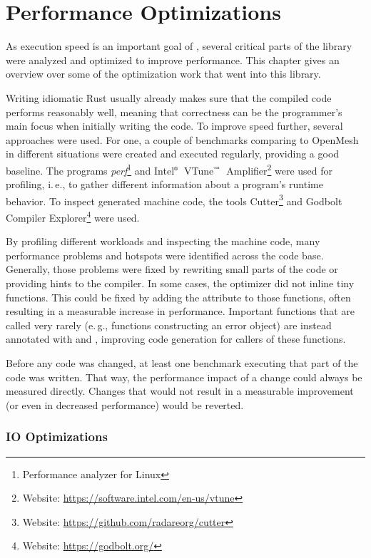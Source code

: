 \section{Performance Optimizations}

As execution speed is an important goal of , several critical parts of the library were analyzed and optimized to improve performance.
This chapter gives an overview over some of the optimization work that went into this library.

Writing idiomatic Rust usually already makes sure that the compiled code performs reasonably well, meaning that correctness can be the programmer's main focus when initially writing the code.
To improve speed further, several approaches were used.
For one, a couple of benchmarks comparing  to OpenMesh in different situations were created and executed regularly, providing a good baseline.
The programs \emph{perf}\footnote{Performance analyzer for Linux} and Intel$^\text{\tiny ®}$~VTune$^\text{\tiny ™}$~Amplifier\footnote{Website: \url{https://software.intel.com/en-us/vtune}} were used for profiling, i.\,e., to gather different information about a program's runtime behavior.
To inspect generated machine code, the tools Cutter\footnote{Website: \url{https://github.com/radareorg/cutter}} and Godbolt Compiler Explorer\footnote{Website: \url{https://godbolt.org/}} were used.

By profiling different workloads and inspecting the machine code, many performance problems and hotspots were identified across the code base.
Generally, those problems were fixed by rewriting small parts of the code or providing hints to the compiler.
In some cases, the optimizer did not inline tiny functions.
This could be fixed by adding the  attribute to those functions, often resulting in a measurable increase in performance.
Important functions that are called very rarely (e.\,g., functions constructing an error object) are instead annotated with  and \code{#[cold]}, improving code generation for callers of these functions.

Before any code was changed, at least one benchmark executing that part of the code was written.
That way, the performance impact of a change could always be measured directly.
Changes that would not result in a measurable improvement (or even in decreased performance) would be reverted.

\vspace{-1mm}
\subsubsection*{IO Optimizations}

